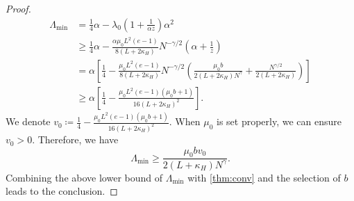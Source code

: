\documentclass[10pt,a4paper]{amsart}
\begin{document}
\begin{proof}
\begin{align*}
    \Lambda_{\min} & =  \frac{1}{4}\alpha - \lambda_{0}\left(1+\frac{1}{\alpha z}\right)\alpha^2\\
    & \geq \frac{1}{4}\alpha - \frac{\alpha\mu_0 L^2(e-1)}{8(L+2\kappa_H) }N^{-\gamma/2}\left(\alpha+\frac{1}{ z}\right)\\
    & = \alpha \left[\frac{1}{4} - \frac{\mu_0 L^2(e-1)}{8(L+2\kappa_H) }N^{-\gamma/2}\left(\frac{\mu_0 b}{2(L+2\kappa_H)N^\gamma}+\frac{N^{\gamma/2}}{2(L+2\kappa_H)}\right)\right]\\
    & \geq \alpha \left[\frac{1}{4} - \frac{\mu_0 L^2(e-1)(\mu_0 b+1)}{16(L+2\kappa_H)^2 }\right].
\end{align*}
We denote $v_0\coloneqq \frac{1}{4} - \frac{\mu_0 L^2(e-1)(\mu_0 b+1)}{16(L+2\kappa_H)^2 }$. When $\mu_0$ is set properly, we can ensure $v_0 > 0$. Therefore, we have
\begin{equation*}
  \Lambda_{\min} \geq \frac{\mu_0bv_0}{2(L+\kappa_H)N^{\gamma}}.  
\end{equation*}
Combining the above lower bound of $\Lambda_{\min}$ with \eqref{thm:conv} and the selection of $b$ leads to the conclusion.
\end{proof}
\end{document}
